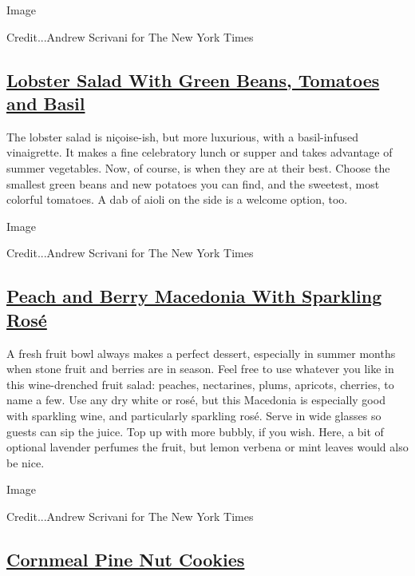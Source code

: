 Image

Credit...Andrew Scrivani for The New York Times

\hypertarget{lobster-salad-with-green-beans-tomatoes-and-basil}{%
\subsection{\texorpdfstring{\href{https://cooking.nytimes3xbfgragh.onion/recipes/1021322-lobster-salad-with-green-beans-tomatoes-and-basil}{Lobster
Salad With Green Beans, Tomatoes and
Basil}}{Lobster Salad With Green Beans, Tomatoes and Basil}}\label{lobster-salad-with-green-beans-tomatoes-and-basil}}

The lobster salad is niçoise-ish, but more luxurious, with a
basil-infused vinaigrette. It makes a fine celebratory lunch or supper
and takes advantage of summer vegetables. Now, of course, is when they
are at their best. Choose the smallest green beans and new potatoes you
can find, and the sweetest, most colorful tomatoes. A dab of aioli on
the side is a welcome option, too.

Image

Credit...Andrew Scrivani for The New York Times

\hypertarget{peach-and-berry-macedonia-with-sparkling-rosuxe9}{%
\subsection{\texorpdfstring{\href{https://cooking.nytimes3xbfgragh.onion/recipes/1021323-peach-and-berry-macedonia-with-sparkling-rose}{Peach
and Berry Macedonia With Sparkling
Rosé}}{Peach and Berry Macedonia With Sparkling Rosé}}\label{peach-and-berry-macedonia-with-sparkling-rosuxe9}}

A fresh fruit bowl always makes a perfect dessert, especially in summer
months when stone fruit and berries are in season. Feel free to use
whatever you like in this wine-drenched fruit salad: peaches,
nectarines, plums, apricots, cherries, to name a few. Use any dry white
or rosé, but this Macedonia is especially good with sparkling wine, and
particularly sparkling rosé. Serve in wide glasses so guests can sip the
juice. Top up with more bubbly, if you wish. Here, a bit of optional
lavender perfumes the fruit, but lemon verbena or mint leaves would also
be nice.

Image

Credit...Andrew Scrivani for The New York Times

\hypertarget{cornmeal-pine-nut-cookies}{%
\subsection{\texorpdfstring{\href{https://cooking.nytimes3xbfgragh.onion/recipes/1021324-cornmeal-pine-nut-cookies}{Cornmeal
Pine Nut
Cookies}}{Cornmeal Pine Nut Cookies}}\label{cornmeal-pine-nut-cookies}}

